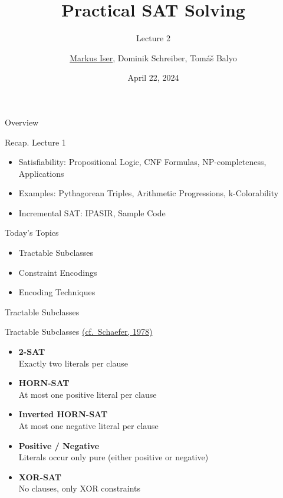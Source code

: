 \documentclass[t]{sdqbeamer}
\title[SAT Solving]{Practical SAT Solving}
\subtitle{Lecture 2}
\author{\underline{Markus Iser}, Dominik Schreiber, Tom\'a\v{s} Balyo}
\date{April 22, 2024}
\begin{document}
\begin{frame}
	\thispagestyle{empty}
	\titlepage
\end{frame}

\begin{frame}{Overview}
	\begin{block}{Recap. Lecture 1}
		\begin{itemize}\setlength{\itemsep}{1em}
			\item Satisfiability: Propositional Logic, CNF Formulas, NP-completeness, Applications
			\item Examples: Pythagorean Triples, Arithmetic Progressions, k-Colorability
			\item Incremental SAT: IPASIR, Sample Code
		\end{itemize}
	\end{block}
	\begin{block}{Today's Topics}
		\begin{itemize}\setlength{\itemsep}{1em}
			\item Tractable Subclasses
			\item Constraint Encodings
			\item Encoding Techniques
		\end{itemize}
	\end{block}
\end{frame}

\begin{frame}{Tractable Subclasses}
\pause
\begin{block}{Tractable Subclasses \href{https://doi.org/10.1145/800133.804350}{(cf.~Schaefer, 1978)}}
	\begin{itemize}\setlength{\itemsep}{1em}
		\item \textbf{2-SAT}\\Exactly two literals per clause
		\item \textbf{HORN-SAT}\\At most one positive literal per clause
		\item \textbf{Inverted HORN-SAT}\\At most one negative literal per clause
		\item \textbf{Positive / Negative}\\Literals occur only pure (either positive or negative)
		\item \textbf{XOR-SAT}\\No clauses, only XOR constraints
	\end{itemize}
\end{block}
\end{frame}
\end{document}
